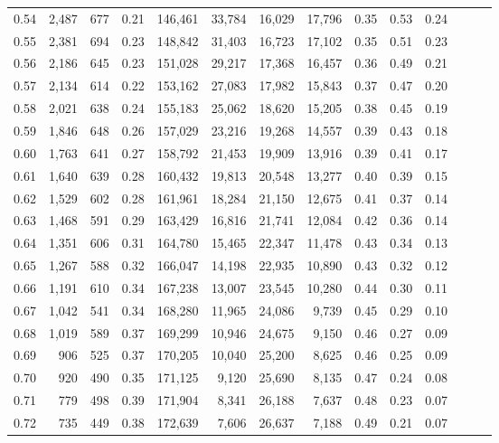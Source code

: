 \begin{tabular}{rrrrrrrrrrrrrr}
0.54 &  2,487 &  677 &  0.21 &  146,461 &   33,784 &  16,029 &  17,796 &  0.35 &  0.53 &      0.24 \\
0.55 &  2,381 &  694 &  0.23 &  148,842 &   31,403 &  16,723 &  17,102 &  0.35 &  0.51 &      0.23 \\
0.56 &  2,186 &  645 &  0.23 &  151,028 &   29,217 &  17,368 &  16,457 &  0.36 &  0.49 &      0.21 \\
0.57 &  2,134 &  614 &  0.22 &  153,162 &   27,083 &  17,982 &  15,843 &  0.37 &  0.47 &      0.20 \\
0.58 &  2,021 &  638 &  0.24 &  155,183 &   25,062 &  18,620 &  15,205 &  0.38 &  0.45 &      0.19 \\
0.59 &  1,846 &  648 &  0.26 &  157,029 &   23,216 &  19,268 &  14,557 &  0.39 &  0.43 &      0.18 \\
0.60 &  1,763 &  641 &  0.27 &  158,792 &   21,453 &  19,909 &  13,916 &  0.39 &  0.41 &      0.17 \\
0.61 &  1,640 &  639 &  0.28 &  160,432 &   19,813 &  20,548 &  13,277 &  0.40 &  0.39 &      0.15 \\
0.62 &  1,529 &  602 &  0.28 &  161,961 &   18,284 &  21,150 &  12,675 &  0.41 &  0.37 &      0.14 \\
0.63 &  1,468 &  591 &  0.29 &  163,429 &   16,816 &  21,741 &  12,084 &  0.42 &  0.36 &      0.14 \\
0.64 &  1,351 &  606 &  0.31 &  164,780 &   15,465 &  22,347 &  11,478 &  0.43 &  0.34 &      0.13 \\
0.65 &  1,267 &  588 &  0.32 &  166,047 &   14,198 &  22,935 &  10,890 &  0.43 &  0.32 &      0.12 \\
0.66 &  1,191 &  610 &  0.34 &  167,238 &   13,007 &  23,545 &  10,280 &  0.44 &  0.30 &      0.11 \\
0.67 &  1,042 &  541 &  0.34 &  168,280 &   11,965 &  24,086 &   9,739 &  0.45 &  0.29 &      0.10 \\
0.68 &  1,019 &  589 &  0.37 &  169,299 &   10,946 &  24,675 &   9,150 &  0.46 &  0.27 &      0.09 \\
0.69 &    906 &  525 &  0.37 &  170,205 &   10,040 &  25,200 &   8,625 &  0.46 &  0.25 &      0.09 \\
0.70 &    920 &  490 &  0.35 &  171,125 &    9,120 &  25,690 &   8,135 &  0.47 &  0.24 &      0.08 \\
0.71 &    779 &  498 &  0.39 &  171,904 &    8,341 &  26,188 &   7,637 &  0.48 &  0.23 &      0.07 \\
0.72 &    735 &  449 &  0.38 &  172,639 &    7,606 &  26,637 &   7,188 &  0.49 &  0.21 &      0.07 \\

\end{tabular}
